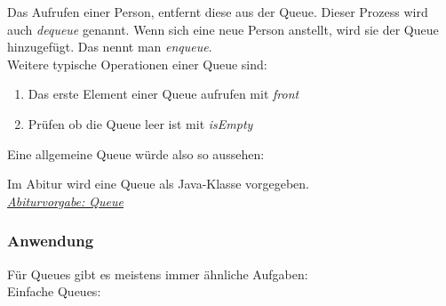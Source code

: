 \begin{flushleft}
    Das Aufrufen einer Person, entfernt diese aus der Queue.
    Dieser Prozess wird auch \textit{dequeue} genannt.
    Wenn sich eine neue Person anstellt, wird sie der Queue hinzugefügt.
    Das nennt man \textit{enqueue}. \\
    Weitere typische Operationen einer Queue sind:
    \begin{enumerate}
        \item {
                Das erste Element einer Queue aufrufen mit \textit{front}
            }
        \item {
                Prüfen ob die Queue leer ist mit \textit{isEmpty}
            }
    \end{enumerate}
    Eine allgemeine Queue würde also so aussehen:
\end{flushleft}

\begin{center}
\end{center}

\begin{flushleft}
    Im Abitur wird eine Queue als Java-Klasse vorgegeben. \\
    \href{https://raw.githubusercontent.com/tim-tm/informatik-notes/main/code/Queue.java}{\textit{Abiturvorgabe: Queue}}
\end{flushleft}

\subsubsection{Anwendung}
\begin{flushleft}
    Für Queues gibt es meistens immer ähnliche Aufgaben: \\
    Einfache Queues:
\end{flushleft}

